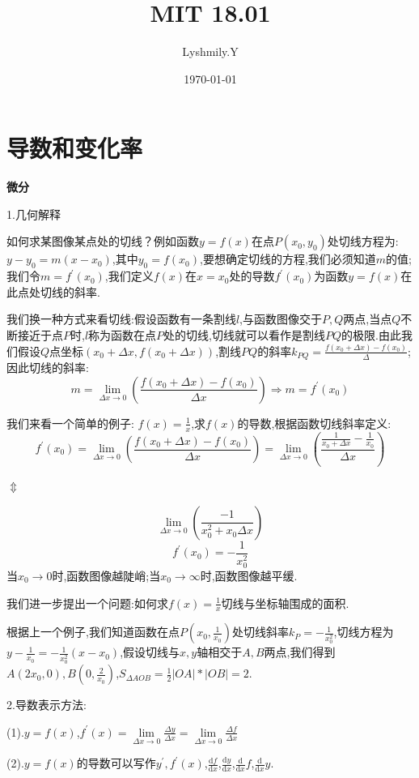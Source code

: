 \documentclass[oneside]{book}
\title{MIT 18.01}
\author{Lyshmily.Y}
\date{\today}
\begin{document}
	\maketitle
	\tableofcontents
	\newpage
	\chapter{导数和变化率}
	\textbf{微分}
	
	1.几何解释
	
	如何求某图像某点处的切线？例如函数$y=f(x)$在点$P(x_{0},y_{0})$处切线方程为:\ $y-y_{0}=m(x-x_{0})$,其中$y_{0}=f(x_{0})$,要想确定切线的方程,我们必须知道$m$的值;我们令$m=f^{'}(x_{0})$,我们定义$f(x)$在$x=x_{0}$处的导数$f^{'}(x_{0})$为函数$y=f(x)$在此点处切线的斜率.
	
	我们换一种方式来看切线:假设函数有一条割线$l$,与函数图像交于$P,Q$两点,当点$Q$不断接近于点$P$时,$l$称为函数在点$P$处的切线,切线就可以看作是割线$PQ$的极限.由此我们假设$Q$点坐标$(x_{0}+\Delta x,f(x_{0}+\Delta x))$,割线$PQ$的斜率$k_{PQ}=\frac{f(x_{0}+\Delta x)-f(x_{0})}{\Delta}$;因此切线的斜率:
	$$m=\lim\limits_{\Delta x\rightarrow 0}(\frac{f(x_{0}+\Delta x)-f(x_{0})}{\Delta x})\Rightarrow m=f^{'}(x_{0})$$
	
	我们来看一个简单的例子:
	$f(x)=\frac{1}{x}$,求$f(x)$的导数,根据函数切线斜率定义:$$f^{'}(x_{0})=\lim\limits_{\Delta x\rightarrow 0}(\frac{f(x_{0}+\Delta x)-f(x_{0})}{\Delta x})=\lim\limits_{\Delta x\rightarrow 0}(\frac{\frac{1}{x_{0}+\Delta x}-\frac{1}{x_{0}}}{\Delta x})$$
	\centerline{$\Updownarrow$}
	$$\lim\limits_{\Delta x\rightarrow 0}(\frac{-1}{x_{0}^{2}+x_{0}\Delta x})$$
	$$f^{'}(x_{0})=-\frac{1}{x_{0}^{2}}$$
	当$x_{0}\rightarrow 0$时,函数图像越陡峭;当$x_{0}\rightarrow \infty$时,函数图像越平缓.
	
	我们进一步提出一个问题:如何求$f(x)=\frac{1}{x}$切线与坐标轴围成的面积.
	
	根据上一个例子,我们知道函数在点$P(x_{0},\frac{1}{x_{0}})$处切线斜率$k_{P}=-\frac{1}{x_{0}^{2}}$,切线方程为$y-\frac{1}{x_{0}}=-\frac{1}{x_{0}^{2}}(x-x_{0})$,假设切线与$x,y$轴相交于$A,B$两点,我们得到$A(2x_{0},0),B(0,\frac{2}{x_{0}})$,$S_{\Delta AOB}=\frac{1}{2}|OA|*|OB|=2$.
	
	2.导数表示方法:
	
	(1).$y=f(x)$,$f^{'}(x)=\lim\limits_{\Delta x\rightarrow 0}\frac{\Delta y}{\Delta x}=\lim\limits_{\Delta x\rightarrow 0}\frac{\Delta f}{\Delta x}$
	
	(2).$y=f(x)$的导数可以写作$y^{'},f^{'}(x)$,$\frac{\mathrm{d}f}{\mathrm{d}x}$,$\frac{\mathrm{d}y}{\mathrm{d}x}$,$\frac{\mathrm{d}}{\mathrm{d}x}f$,$\frac{\mathrm{d}}{\mathrm{d}x}y$.
	
\end{document}
